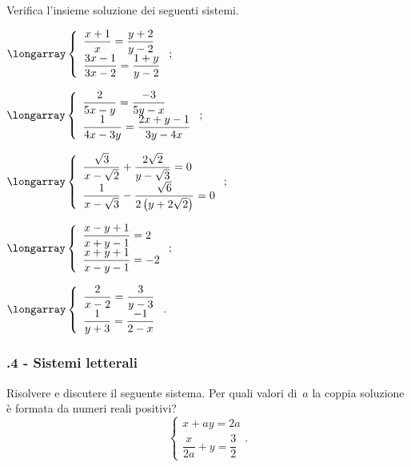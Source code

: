 \begin{esercizio}
 \label{ese:22.49}
Verifica l'insieme soluzione dei seguenti sistemi.
\begin{multicols}{2}
\begin{enumeratea}
\item $\longarray\left\{\begin{array}{l}{\dfrac{x+1}{x}=\dfrac{y+2}{y-2}}\\{\dfrac{3x-1}{3x-2}=\dfrac{1+y}{y-2}}\end{array}\right.;$
\item $\longarray\left\{\begin{array}{l}{\dfrac{2}{5x-y}=\dfrac{-3}{5y-x}}\\{\dfrac{1}{4x-3y}=\dfrac{2x+y-1}{3y-4x}}\end{array}\right.;$
\item $\longarray\left\{\begin{array}{l}{\dfrac{\sqrt{3}}{x-\sqrt{2}}+\dfrac{2\sqrt{2}}{y-\sqrt{3}}=0}\\{\dfrac{1}{x-\sqrt{3}}-\dfrac{\sqrt{6}}{2\left(y+2\sqrt{2}\right)}=0}\end{array}\right.;$
\item $\longarray\left\{\begin{array}{l}{\dfrac{x-y+1}{x+y-1}=2}\\{\dfrac{x+y+1}{x-y-1}=-2}\end{array}\right.;$
\item $\longarray\left\{\begin{array}{l}{\dfrac{2}{x-2}=\dfrac{3}{y-3}}\\{\dfrac{1}{y+3}=\dfrac{-1}{2-x}}\end{array}\right..$
\end{enumeratea}
\end{multicols}
\end{esercizio}


\subsubsection*{\thechapter.4 - Sistemi letterali}

\begin{esercizio}[\Ast]
 \label{ese:22.50}
Risolvere e discutere il seguente sistema. Per quali valori di~$a$ la coppia soluzione è formata da
numeri reali positivi?
\[\left\{\begin{array}{l}{x+ay=2a}\\\dfrac{x}{2a}+y=\dfrac{3}{2}\end{array}\right..\]
\end{esercizio}


